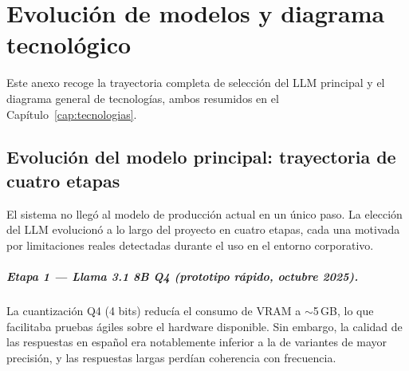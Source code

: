 \chapter{Evolución de modelos y diagrama tecnológico}
\label{anexo:evolucion}

Este anexo recoge la trayectoria completa de selección del LLM principal y el diagrama general de tecnologías, ambos resumidos en el Capítulo~\ref{cap:tecnologias}.

\section{Evolución del modelo principal: trayectoria de cuatro etapas}
\label{anexo:evolucion-modelos}

El sistema no llegó al modelo de producción actual en un único paso. La elección del LLM evolucionó a lo largo del proyecto en cuatro etapas, cada una motivada por limitaciones reales detectadas durante el uso en el entorno corporativo.

\begin{table}[H]
\centering
\caption{Trayectoria completa de LLMs empleados en el proyecto, desde el prototipo hasta producción.}
\label{tab:evolucion-modelos}
\end{table}

\paragraph{Etapa 1 --- Llama 3.1 8B Q4 (prototipo rápido, octubre 2025).}
La cuantización Q4 (4 bits) reducía el consumo de VRAM a $\sim$5\,GB, lo que facilitaba pruebas ágiles sobre el hardware disponible. Sin embargo, la calidad de las respuestas en español era notablemente inferior a la de variantes de mayor precisión, y las respuestas largas perdían coherencia con frecuencia.

